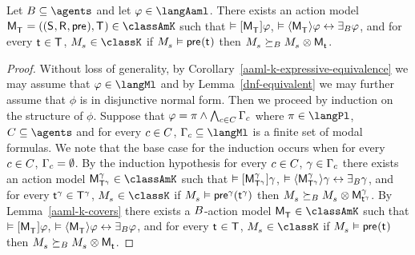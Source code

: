 \begin{theorem}\label{aaml-k-synthesis}
Let $\agentsB \subseteq \agents$ and let $\phi \in \langAaml$.
There exists an action model $\aPModelAndTuple{\aStatesT} \in \classAmK$ such that 
$\entails \actionA{\aPModel{\aStatesT}} \phi$,
$\entails \actionE{\aPModel{\aStatesT}} \phi \iff \someactsBs \phi$, and
for every $\aStateT \in \aStatesT$, $\kPModel{\kStateS} \in \classK$ if $\kPModel{\kStateS} \entails \aPrecondition(\aStateT)$ then $\kPModel{\kStateS} \simulatesBs \kPModel{\kStateS} \exec \aPModel{\aStateT}$.
\end{theorem}

\begin{proof}
Without loss of generality, by Corollary~\ref{aaml-k-expressive-equivalence} we may assume that $\phi \in \langMl$ and by Lemma~\ref{dnf-equivalent} we may further assume that $\phi$ is in disjunctive normal form.
Then we proceed by induction on the structure of $\phi$.  
Suppose that $\phi = \pi \land \bigwedge_{\agentC \in \agentsC} \Gamma_\agentC$ where $\pi \in \langPl$, $\agentsC \subseteq \agents$ and for every $\agentC \in \agentsC$, $\Gamma_\agentC \subseteq \langMl$ is a finite set of modal formulas.
We note that the base case for the induction occurs when for every $\agentC \in \agentsC$, $\Gamma_\agentC = \emptyset$.
By the induction hypothesis for every $\agentC \in \agentsC$, $\gamma \in \Gamma_\agentC$ there exists 
an action model $\aPModel[\gamma]{\aStatesT[\gamma]} \in \classAmK$ such that
$\entails \actionA{\aPModel[\gamma]{\aStatesT[\gamma]}} \gamma$,
$\entails \actionE{\aPModel[\gamma]{\aStatesT[\gamma]}} \gamma \iff \someactsBs \gamma$, and
for every $\aStateT[\gamma] \in \aStatesT[\gamma]$, $\kPModel{\kStateS} \in \classK$ if $\kPModel{\kStateS} \entails \aPrecondition[\gamma](\aStateT[\gamma])$ then $\kPModel{\kStateS} \simulatesBs \kPModel{\kStateS} \exec \aPModel[\gamma]{\aStateT[\gamma]}$.
By Lemma~\ref{aaml-k-covers} there exists a $\agentsB$-action model $\aPModel{\aStatesT} \in \classAmK$ such that 
$\entails \actionA{\aPModel{\aStatesT}} \phi$,
$\entails \actionE{\aPModel{\aStatesT}} \phi \iff \someactsBs \phi$, and
for every $\aStateT \in \aStatesT$, $\kPModel{\kStateS} \in \classK$ if $\kPModel{\kStateS} \entails \aPrecondition(\aStateT)$ then $\kPModel{\kStateS} \simulatesBs \kPModel{\kStateS} \exec \aPModel{\aStateT}$.


\end{proof}
